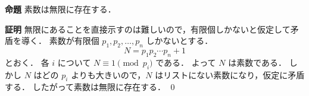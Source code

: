 \textbf{命題} 素数は無限に存在する．

\textbf{証明}
無限にあることを直接示すのは難しいので，有限個しかないと仮定して矛盾を導く．
素数が有限個 $p_1, p_2, \dots, p_n$ しかないとする．
\[
  N = p_1 p_2 \cdots p_n + 1
\]
とおく．
各 $i$ について $N \equiv 1 \pmod{p_i}$ である．
よって $N$ は素数である．
しかし $N$ はどの $p_i$ よりも大きいので，$N$ はリストにない素数になり，仮定に矛盾する．
したがって素数は無限に存在する． \qed
